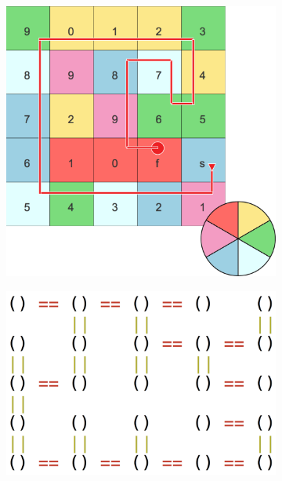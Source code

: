 \documentclass{article}
\begin{document}
	\begin{figure}[t]
\centering
\begin{subfigure}{.18\textwidth}
  \centering
  \includegraphics[width=\linewidth]{Images/cm.png}
  \caption{}
  \label{fig:cm}
\end{subfigure}%
\hspace{.085\textwidth}
\begin{subfigure}{.20\textwidth}
  \centering
  \includegraphics[width=\linewidth]{Images/pm.png}
  \caption{}
  \label{fig:pm}
\end{subfigure}

\end{figure}
\end{document}
